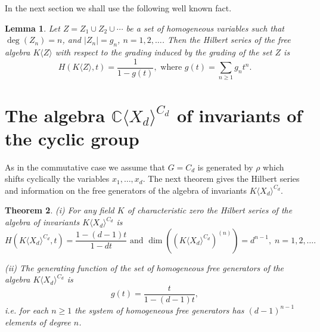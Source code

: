 \documentclass{amsart}
\newtheorem{theorem}{Theorem}[section]
\newtheorem{lemma}[theorem]{Lemma}
\theoremstyle{definition}
\newcommand{\CXdCd}{{\mathbb C}\langle X_d\rangle^{C_d}}
\begin{document}
In the next section we shall use the following well known fact.

\begin{lemma}\label{generating function}
Let $Z=Z_1\cup Z_2\cup \cdots$ be a set of homogeneous variables such that $\deg(Z_n)=n$,
and $\vert Z_n\vert=g_n$, $n=1,2,\ldots$. Then the Hilbert series of the free algebra $K\langle Z\rangle$
with respect to the grading induced by the grading of the set $Z$ is
\[
H(K\langle Z\rangle,t)=\frac{1}{1-g(t)},\text{ where }g(t)=\sum_{n\geq 1}g_nt^n.
\]
\end{lemma}

\section{\textbf{The algebra $\CXdCd$ of invariants of the cyclic group}}
As in the commutative case we assume that $G=C_d$ is generated by $\rho$ which shifts cyclically the variables $x_1,\ldots,x_d$.
The next theorem gives the Hilbert series and information on the free generators of the algebra of invariants $K\langle X_d\rangle^{C_d}$.

\begin{theorem}\label{Hilbert series and free generators}
{\rm (i)} For any field $K$ of characteristic zero the Hilbert series of the algebra of invariants $K\langle X_d\rangle^{C_d}$ is
\[
H(K\langle X_d\rangle^{C_d},t)=\frac{1-(d-1)t}{1-dt}\text{ and }\dim\left((K\langle X_d\rangle^{C_d})^{(n)}\right)=d^{n-1},\; n=1,2,\ldots.
\]

{\rm (ii)} The generating function of the set of homogeneous free generators of the algebra $K\langle X_d\rangle^{C_d}$ is
\[
g(t)=\frac{t}{1-(d-1)t},
\]
i.e. for each $n\geq 1$ the system of homogeneous free generators has $(d-1)^{n-1}$ elements of degree $n$.
\end{theorem}
\end{document}
